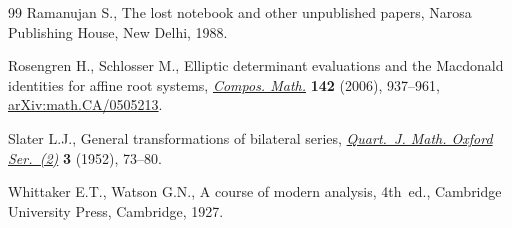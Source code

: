 \documentclass[10pt,a4paper]{amsart}
\numberwithin{equation}{section}
\begin{document}
\begin{thebibliography}{99}
Ramanujan S., The lost notebook and other unpublished papers, Narosa Publishing
 House, New Delhi, 1988.

Rosengren H., Schlosser M., Elliptic determinant evaluations and the
 {M}acdonald identities for affine root systems,
 \href{https://doi.org/10.1112/S0010437X0600203X}{\textit{Compos. Math.}}
 \textbf{142} (2006), 937--961,
 \href{http://arxiv.org/abs/math.CA/0505213}{arXiv:math.CA/0505213}.

Slater L.J., General transformations of bilateral series,
 \href{https://doi.org/10.1093/qmath/3.1.73}{\textit{Quart.~J. Math. Oxford
 Ser.~(2)}} \textbf{3} (1952), 73--80.

Whittaker E.T., Watson G.N., A course of modern analysis, 4th~ed., Cambridge University Press,  Cambridge, 1927.

\end{thebibliography}
\end{document}
